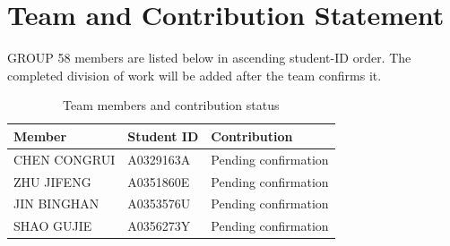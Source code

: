 \section{Team and Contribution Statement}\label{app:contributions}
GROUP 58 members are listed below in ascending student-ID order.  The completed division of work will be added after the team confirms it.
\begin{table}[htbp]
\caption{Team members and contribution status}
\centering
\begin{tabularx}{\columnwidth}{@{}l l X@{}}
\toprule
Member & Student ID & Contribution \\
\midrule
CHEN CONGRUI & A0329163A & Pending confirmation \\
ZHU JIFENG & A0351860E & Pending confirmation \\
JIN BINGHAN & A0353576U & Pending confirmation \\
SHAO GUJIE & A0356273Y & Pending confirmation \\
\bottomrule
\end{tabularx}
\end{table}

